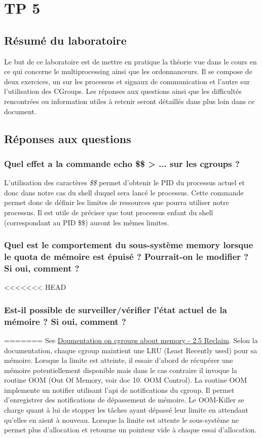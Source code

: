 \documentclass{ReportTemplate}
\begin{document}
\chapter{TP 5}
\section{Résumé du laboratoire}
Le but de ce laboratoire est de mettre en pratique la théorie vue dans le cours
en ce qui concerne le multiprocessing ainsi que les ordonnanceurs. Il se compose
de deux exercices, un sur les processus et signaux de communication et l'autre
sur l'utilisation des CGroups. Les réponses aux questions ainsi que les
difficultés rencontrées ou information utiles à retenir seront détaillés dans
plus loin dans ce document.

\section{Réponses aux questions}
\subsection{Quel effet a la commande echo \$\$ > ... sur les cgroups ?}
L'utilisation des caractères \textit{\$\$} permet d'obtenir le PID du processus
actuel et donc dans notre cas du shell duquel sera lancé le processus. Cette
commande permet donc de définir les limites de ressources que pourra utiliser
notre processus. Il est utile de préciser que tout processus enfant du shell
(correspondant au PID \$\$) auront les mêmes limites.
\subsection{Quel est le comportement du sous-système memory lorsque le quota de mémoire est épuisé ? Pourrait-on le modifier ? Si oui, comment ?}
<<<<<<< HEAD

\subsection{Est-il possible de surveiller/vérifier l’état actuel de la mémoire ? Si oui, comment ?}
=======
See
\href{https://www.kernel.org/doc/Documentation/cgroup-v1/memory.txt}{Doumentation
on cgroups about memory - 2.5 Reclaim}.\newline
Selon la documentation, chaque cgroup maintient une LRU (Least Recently used)
pour sa mémoire. Lorsque la limite est atteinte, il essaie d'abord de récupérer
une mémoire potentiellement disponible mais dans le cas contraire il invoque la
routine OOM (Out Of Memory, voir doc 10. OOM Control). La routine OOM implemente
un notifier utilisant l'api de notifications du cgroup. Il permet d'enregistrer
des notifications de dépassement de mémoire. Le OOM-Killer se charge quant à lui
de stopper les tâches ayant dépassé leur limite en attendant qu'elles en aient à
nouveau.\newline
Lorsque la limite est attente le sous-système ne permet plus d'allocation et
retourne un pointeur vide à chaque essai d'allocation.
\end{document}
